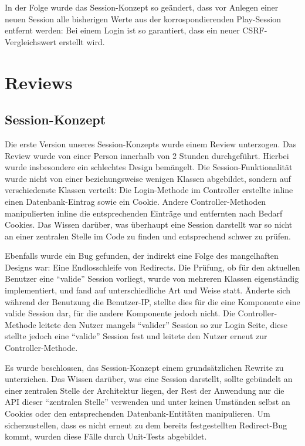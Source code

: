 \documentclass[12pt,DIV14,BCOR10mm,a4paper,parskip=half-,headsepline,headinclude,english,ngerman,bibliography=totocnumbered]{scrreprt}
\begin{document}
In der Folge wurde das Session-Konzept so geändert, dass vor Anlegen einer neuen Session alle bisherigen Werte aus der korrospondierenden Play-Session entfernt werden: Bei einem Login ist so garantiert, dass ein neuer CSRF-Vergleichswert erstellt wird.


\section{Reviews}
\subsection{Session-Konzept}
Die erste Version unseres Session-Konzepts wurde einem Review unterzogen. Das Review wurde von einer Person innerhalb von 2 Stunden durchgeführt. Hierbei wurde insbesondere ein schlechtes Design bemängelt. Die Session-Funktionalität wurde nicht von einer beziehungsweise wenigen Klassen abgebildet, sondern auf verschiedenste Klassen verteilt: Die Login-Methode im Controller erstellte inline einen Datenbank-Eintrag sowie ein Cookie. Andere Controller-Methoden manipulierten inline die entsprechenden Einträge und entfernten nach Bedarf Cookies. Das Wissen darüber, was überhaupt eine Session darstellt war so nicht an einer zentralen Stelle im Code zu finden und entsprechend schwer zu prüfen.

Ebenfalls wurde ein Bug gefunden, der indirekt eine Folge des mangelhaften Designs war: Eine Endlosschleife von Redirects. Die Prüfung, ob für den aktuellen Benutzer eine \enquote{valide} Session vorliegt, wurde von mehreren Klassen eigenständig implementiert, und fand auf unterschiedliche Art und Weise statt. Änderte sich während der Benutzung die Benutzer-IP, stellte dies für die eine Komponente eine valide Session dar, für die andere Komponente jedoch nicht. Die Controller-Methode leitete den Nutzer mangels \enquote{valider} Session so zur Login Seite, diese stellte jedoch eine \enquote{valide} Session fest und leitete den Nutzer erneut zur Controller-Methode.

Es wurde beschlossen, das Session-Konzept einem grundsätzlichen Rewrite zu unterziehen. Das Wissen darüber, was eine Session darstellt, sollte gebündelt an einer zentralen Stelle der Architektur liegen, der Rest der Anwendung nur die API dieser \enquote{zentralen Stelle} verwenden und unter keinen Umständen selbst an Cookies oder den entsprechenden Datenbank-Entitäten manipulieren. Um sicherzustellen, dass es nicht erneut zu dem bereits festgestellten Redirect-Bug kommt, wurden diese Fälle durch Unit-Tests abgebildet.
\end{document}

